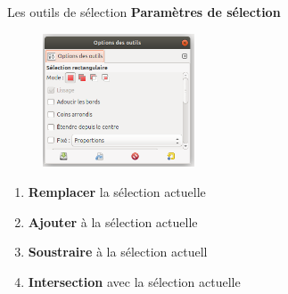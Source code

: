 \documentclass[10pt,svgnames,usenames,table]{beamer}
\begin{document}
\begin{frame}{Les outils de sélection}
\textbf{Paramètres de sélection}
\begin{figure}
        \centering
        \includegraphics[width=0.4\textwidth]{Images/option_outil} 
\end{figure}

\begin{enumerate}
	\item \textbf{Remplacer} la sélection actuelle
	\item \textbf{Ajouter} à la sélection actuelle
	\item \textbf{Soustraire} à la sélection actuell
	\item \textbf{Intersection} avec la sélection actuelle	
\end{enumerate}
\end{frame}
\end{document}
